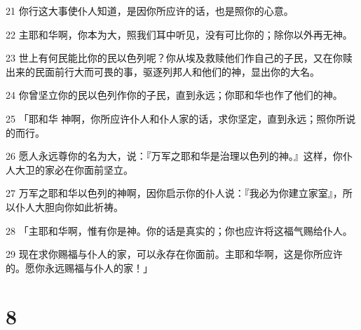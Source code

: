 \par 21 你行这大事使仆人知道，是因你所应许的话，也是照你的心意。
\par 22 主耶和华啊，你本为大，照我们耳中听见，没有可比你的；除你以外再无神。
\par 23 世上有何民能比你的民以色列呢？你从埃及救赎他们作自己的子民，又在你赎出来的民面前行大而可畏的事，驱逐列邦人和他们的神，显出你的大名。
\par 24 你曾坚立你的民以色列作你的子民，直到永远；你耶和华也作了他们的神。
\par 25 「耶和华 神啊，你所应许仆人和仆人家的话，求你坚定，直到永远；照你所说的而行。
\par 26 愿人永远尊你的名为大，说：『万军之耶和华是治理以色列的神。』这样，你仆人大卫的家必在你面前坚立。
\par 27 万军之耶和华以色列的神啊，因你启示你的仆人说：『我必为你建立家室』，所以仆人大胆向你如此祈祷。
\par 28 「主耶和华啊，惟有你是神。你的话是真实的；你也应许将这福气赐给仆人。
\par 29 现在求你赐福与仆人的家，可以永存在你面前。主耶和华啊，这是你所应许的。愿你永远赐福与仆人的家！」

\chapter{8}

